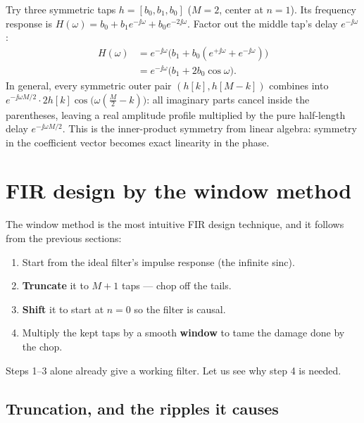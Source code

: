 \begin{connectionbox}
Try three symmetric taps $h = [b_0, b_1, b_0]$ ($M=2$, center at $n=1$). Its frequency response is $H(\omega) = b_0 + b_1 e^{-\jj\omega} + b_0 e^{-2\jj\omega}$. Factor out the middle tap's delay $e^{-\jj\omega}$:
\begin{align*}
H(\omega) &= e^{-\jj\omega}\bigl(b_1 + b_0(e^{+\jj\omega} + e^{-\jj\omega})\bigr) \\
          &= e^{-\jj\omega}\bigl(b_1 + 2b_0\cos\omega\bigr).
\end{align*}
In general, every symmetric outer pair $(h[k], h[M-k])$ combines into $e^{-\jj\omega M/2}\cdot 2h[k]\cos\!\big(\omega(\tfrac{M}{2}-k)\big)$: all imaginary parts cancel inside the parentheses, leaving a real amplitude profile multiplied by the pure half-length delay $e^{-\jj\omega M/2}$. This is the inner-product symmetry from linear algebra: symmetry in the coefficient vector becomes exact linearity in the phase.
\end{connectionbox}

\section{FIR design by the window method}
\label{ch16:window}

The window method is the most intuitive FIR
design technique, and it follows from the previous sections:

\begin{enumerate}
\item Start from the ideal filter's impulse response (the infinite sinc).
\item \textbf{Truncate} it to $M+1$ taps --- chop off the tails.
\item \textbf{Shift} it to start at $n=0$ so the filter is causal.
\item Multiply the kept taps by a smooth \textbf{window} to tame the damage done by
the chop.
\end{enumerate}

Steps 1--3 alone already give a working filter. Let us see why step 4 is needed.

\subsection{Truncation, and the ripples it causes}
\label{ch16:gibbs}

